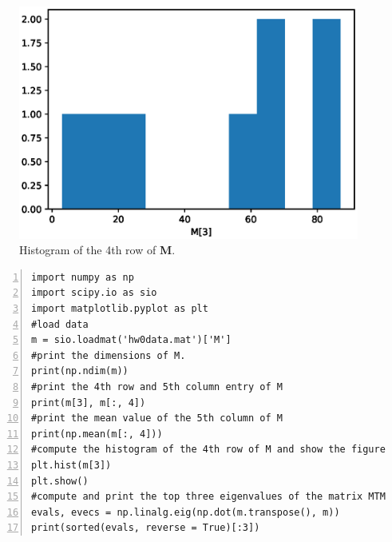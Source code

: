 \documentclass[twoside,11pt]{homework}
\begin{document}
{%
\begin{figure}[ht]
\centering
\includegraphics[scale=0.7]{hist1.eps}
\caption{Histogram of the 4th row of \textbf{M}.}
\label{F1}
\end{figure}
%
\begin{colorboxed}
\begin{lstlisting}[language={[ANSI]C},numbers=left,numberstyle=\tiny, frame=single, title=HW0\_4.1.py, breaklines=true,
   rulesepcolor=\color{red!20!green!20!blue!20},
   keywordstyle=\color{blue!70!black},
   commentstyle=\color{blue!90!},
   basicstyle=\ttfamily]
import numpy as np
import scipy.io as sio
import matplotlib.pyplot as plt
#load data
m = sio.loadmat('hw0data.mat')['M']
#print the dimensions of M.
print(np.ndim(m))
#print the 4th row and 5th column entry of M
print(m[3], m[:, 4])
#print the mean value of the 5th column of M
print(np.mean(m[:, 4]))
#compute the histogram of the 4th row of M and show the figure
plt.hist(m[3])
plt.show()
#compute and print the top three eigenvalues of the matrix MTM
evals, evecs = np.linalg.eig(np.dot(m.transpose(), m))
print(sorted(evals, reverse = True)[:3])
\end{lstlisting}
\end{colorboxed}

}
\end{document}
